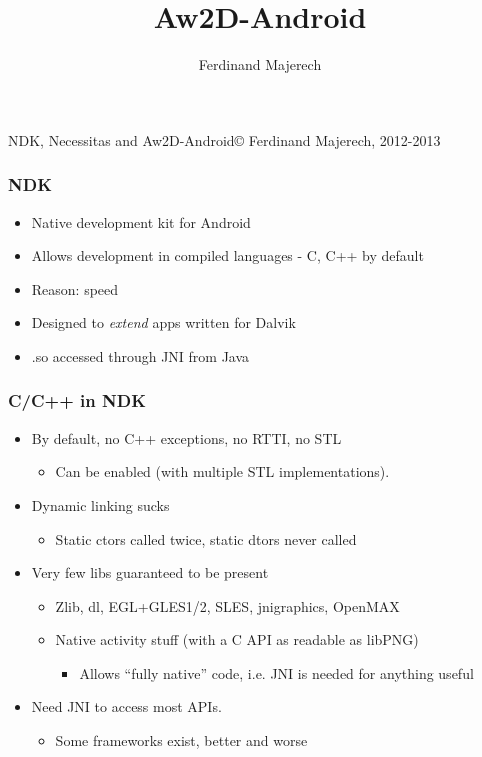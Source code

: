 \documentclass[ignorenonframetext]{beamer}
\title{Aw2D-Android}
\author{Ferdinand Majerech}
\institute[UPJŠ]{Univerzita Pavla Jozefa Šafárika v Košiciach\\UPJŠ}
\begin{document}
NDK, Necessitas and Aw2D-Android© Ferdinand Majerech, 2012-2013
\begin{frame}[plain]
  \titlepage
\end{frame}

\begin{frame}[fragile]
\frametitle{NDK}

\begin{itemize}

\item Native development kit for Android

\item Allows development in compiled languages
- C, C++ by default

\item Reason: speed

\item Designed to \emph{extend} apps written for Dalvik

\item .so accessed through JNI from Java
\end{itemize}
\end{frame}

\begin{frame}[fragile]
\frametitle{C/C++ in NDK}

\begin{itemize}

\item By default, no C++ exceptions, no RTTI, no STL
\begin{itemize}

\item Can be enabled (with multiple STL implementations).
\end{itemize}

\item Dynamic linking sucks
\begin{itemize}

\item Static ctors called twice, static dtors never called
\end{itemize}

\item Very few libs guaranteed to be present
\begin{itemize}

\item Zlib, dl, EGL+GLES1/2, SLES, jnigraphics, OpenMAX

\item Native activity stuff (with a C API as readable as libPNG)
\begin{itemize}

\item Allows ``fully native'' code, i.e. JNI is needed for anything useful
\end{itemize}
\end{itemize}

\item Need JNI to access most APIs.
\begin{itemize}

\item Some frameworks exist, better and worse
\end{itemize}
\end{itemize}
\end{frame}
\end{document}
